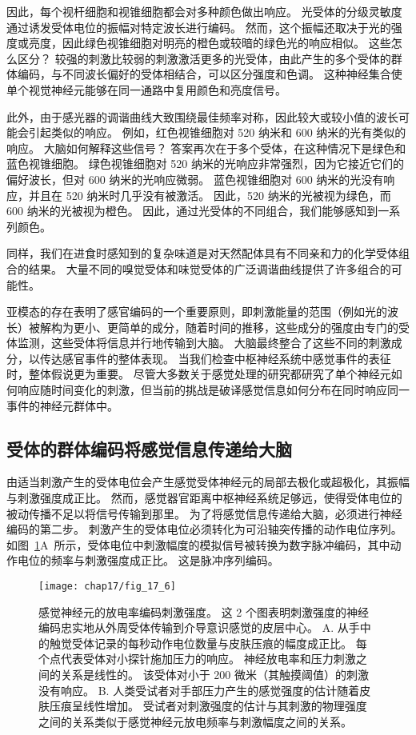 因此，每个视杆细胞和视锥细胞都会对多种颜色做出响应。
光受体的分级灵敏度通过诱发受体电位的振幅对特定波长进行编码。
然而，这个振幅还取决于光的强度或亮度，因此绿色视锥细胞对明亮的橙色或较暗的绿色光的响应相似。
这些怎么区分？ 
较强的刺激比较弱的刺激激活更多的光受体，由此产生的多个受体的群体编码，与不同波长偏好的受体相结合，可以区分强度和色调。 
这种神经集合使单个视觉神经元能够在同一通路中复用颜色和亮度信号。


此外，由于感光器的调谐曲线大致围绕最佳频率对称，因此较大或较小值的波长可能会引起类似的响应。
例如，红色视锥细胞对 520 纳米和 600 纳米的光有类似的响应。
大脑如何解释这些信号？
答案再次在于多个受体，在这种情况下是绿色和蓝色视锥细胞。
绿色视锥细胞对 520 纳米的光响应非常强烈，因为它接近它们的偏好波长，但对 600 纳米的光响应微弱。
蓝色视锥细胞对 600 纳米的光没有响应，并且在 520 纳米时几乎没有被激活。
因此，520 纳米的光被视为绿色，而 600 纳米的光被视为橙色。
因此，通过光受体的不同组合，我们能够感知到一系列颜色。


同样，我们在进食时感知到的复杂味道是对天然配体具有不同亲和力的化学受体组合的结果。 
大量不同的嗅觉受体和味觉受体的广泛调谐曲线提供了许多组合的可能性。


亚模态的存在表明了感官编码的一个重要原则，即刺激能量的范围（例如光的波长）被解构为更小、更简单的成分，随着时间的推移，这些成分的强度由专门的受体监测，这些受体将信息并行地传输到大脑。
大脑最终整合了这些不同的刺激成分，以传达感官事件的整体表现。 
当我们检查中枢神经系统中感觉事件的表征时，整体假说更为重要。 
尽管大多数关于感觉处理的研究都研究了单个神经元如何响应随时间变化的刺激，但当前的挑战是破译感觉信息如何分布在同时响应同一事件的神经元群体中。


\subsection{受体的群体编码将感觉信息传递给大脑}

由适当刺激产生的受体电位会产生感觉受体神经元的局部去极化或超极化，其振幅与刺激强度成正比。
然而，感觉器官距离中枢神经系统足够远，使得受体电位的被动传播不足以将信号传输到那里。
为了将感觉信息传递给大脑，必须进行神经编码的第二步。
刺激产生的受体电位必须转化为可沿轴突传播的动作电位序列。
如图~\ref{fig:17_6}A~所示，受体电位中刺激幅度的模拟信号被转换为数字脉冲编码，其中动作电位的频率与刺激强度成正比。
这是脉冲序列编码。


\begin{figure}[htbp]
	\centering
	\texttt{[image: chap17/fig\_17\_6]}
	\caption{感觉神经元的放电率编码刺激强度。 
		这 2 个图表明刺激强度的神经编码忠实地从外周受体传输到介导意识感觉的皮层中心\cite{mountcastle1966neural}。
		A. 从手中的触觉受体记录的每秒动作电位数量与皮肤压痕的幅度成正比。
		每个点代表受体对小探针施加压力的响应。
		神经放电率和压力刺激之间的关系是线性的。
		该受体对小于 200 微米（其触摸阈值）的刺激没有响应。
		B. 人类受试者对手部压力产生的感觉强度的估计随着皮肤压痕呈线性增加。
		受试者对刺激强度的估计与其刺激的物理强度之间的关系类似于感觉神经元放电频率与刺激幅度之间的关系。}
	\label{fig:17_6}
\end{figure}



